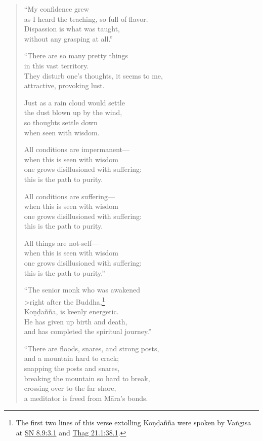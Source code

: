 \documentclass[12pt,openany]{book}%
\begin{document}
\begin{verse}%
“My confidence grew \\
as I heard the teaching, so full of flavor. \\
Dispassion is what was taught, \\
without any grasping at all.” 

“There are so many pretty things \\
in this vast territory. \\
They disturb one’s thoughts, it seems to me, \\
attractive, provoking lust. 

Just as a rain cloud would settle \\
the dust blown up by the wind, \\
so thoughts settle down \\
when seen with wisdom. 

All conditions are impermanent—\\
when this is seen with wisdom \\
one grows disillusioned with suffering: \\
this is the path to purity. 

All conditions are suffering—\\
when this is seen with wisdom \\
one grows disillusioned with suffering: \\
this is the path to purity. 

All things are not-self—\\
when this is seen with wisdom \\
one grows disillusioned with suffering: \\
this is the path to purity.” 

“The senior monk who was awakened \\>right after the Buddha,\footnote{The first two lines of this verse extolling \textsanskrit{Koṇḍañña} were spoken by \textsanskrit{Vaṅgīsa} at \href{https://suttacentral.net/sn8.9/en/sujato\#3.1}{SN 8.9:3.1} and \href{https://suttacentral.net/thag21.1/en/sujato\#38.1}{Thag 21.1:38.1}. } \\
\textsanskrit{Koṇḍañña}, is keenly energetic. \\
He has given up birth and death, \\
and has completed the spiritual journey.” 

“There are floods, snares, and strong posts, \\
and a mountain hard to crack; \\
snapping the posts and snares, \\
breaking the mountain so hard to break, \\
crossing over to the far shore, \\
a meditator is freed from \textsanskrit{Māra}’s bonds. 


\end{verse}
\end{document}
